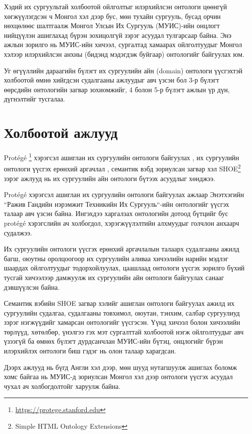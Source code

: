\documentclass[conference, a4paper, mongolian]{myIEEEtran}
\begin{document}
Хэдий их сургуультай холбоотой ойлголтыг илэрхийлсэн онтологи цөөнгүй хөгжүүлэгдсэн ч Монгол хэл дээр бус, мөн тухайн сургууль, бусад орчин нөхцөлөөс шалтгаалж Монгол Улсын Их Сургууль (МУИС)-ийн онцлогт нийцүүлэн ашиглахад бүрэн зохицолгүй зэрэг асуудал тулгарсаар байна. Энэ ажлын зорилго нь МУИС-ийн хичээл, сургалтад хамаарах ойлголтуудыг Монгол хэлээр илэрхийлсэн анхны (бидэнд мэдэгдэж буйгаар) онтологийг байгуулах юм.

Уг өгүүллийн дараагийн бүлэгт их сургуулийн айн (domain) онтологи үүсгэхтэй холбоотой өмнө хийгдсэн судалгааны ажлуудыг авч үзсэн бол 3-р бүлэгт өөрсдийн онтологийн загвар зохиомжийг, 4 болон 5-р бүлэгт ажлын үр дүн, дүгнэлтийг тусгалаа.
%
\section{Холбоотой ажлууд}
%
Prot\'eg\'e \footnote{\url{https://protege.stanford.edu}} хэрэгсэл ашиглан их сургуулийн онтологи байгуулах \cite{bib:3}, их сургуулийн онтологи үүсгэх ерөнхий аргачлал \cite{bib:4}, семантик вэбд зориулсан загвар хэл SHOE\footnote{Simple HTML Ontology Extensions} \cite{bib:5} зэрэг ажлууд нь их сургуулийн айн онтологи бүтээх асуудлыг хөнджээ.

Prot\'eg\'e хэрэгсэл ашиглан их сургуулийн онтологи байгуулах ажлаар Энэтхэгийн ``Ражив Гандийн нэрэмжит Техникийн Их Сургууль``-ийн онтологийг үүсгэх талаар авч үзсэн байна. Ингэхдээ харгалзах онтологийн дотоод бүтцийг бус prot\'eg\'e хэрэгслийн ач холбогдол, хэрэгжүүлэлтийн алхмуудыг голчлон анхаарч судалжээ.

Их сургуулийн онтологи үүсгэх ерөнхий аргачлалын талаарх судалгааны ажилд багш, оюутны оролцоогоор их сургуулийн аливаа хичээлийн нарийн мэдлэг шаардах ойлголтуудыг тодорхойлуулах, цаашлаад онтологи үүсгэх зорилго бүхий тусгай хичээлээр дамжуулж их сургуулийн айн онтологи байгуулах санааг дэвшүүлсэн байна.

Семантик вэбийн SHOE загвар хэлийг ашиглан онтологи байгуулах \cite{bib:6} ажилд их сургуулийн судалгаа, судалгааны товхимол, оюутан, тэнхим, салбар сургуулиуд зэрэг нэгжүүдийг хамарсан онтологийг үүсгэсэн. Үүнд хичээл болон хичээлийн төрлүүд, хөтөлбөр, үнэлгээ гэх мэт сургалттай холбоотой нэгж ойлголтуудыг авч үзээгүй ба өмнөх бүлэгт дурдсанчлан МУИС-ийн бүтэц, онцлогийг бүрэн илэрхийлэх онтологи биш гэдэг нь олон талаар харагдсан.

Дээрх ажлууд нь бүгд Англи хэл дээр, мөн шууд нутагшуулж ашиглах боломж хомс байгаа нь МУИС-д зориулсан Монгол хэл дээр онтологи үүсгэх асуудал чухал ач холбогдолтойг харуулж байна.
%
\end{document}
